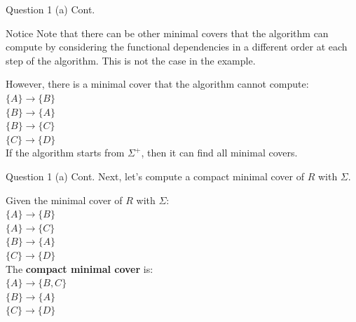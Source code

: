 \begin{frame}[fragile]{Question 1 (a) Cont.}
	\begin{alertblock}{Notice}
	Note that there can be other minimal covers that the algorithm can compute by considering the functional dependencies in a different order at each step of the algorithm. This is not the case in the example.
	\end{alertblock}\vspace{5pt}

	However, there is a minimal cover that the algorithm cannot compute:\\\vspace{5pt}
	$\{A\} \rightarrow \{B\}$\\
	$\{B\} \rightarrow \{A\}$\\
	$\{B\} \rightarrow \{C\}$\\
	$\{C\} \rightarrow \{D\}$\\\vspace{10pt}	
	If the algorithm starts from $\Sigma^{+}$, then it can find all minimal covers.
\end{frame}

\begin{frame}[fragile]{Question 1 (a) Cont.}
	Next, let's compute a compact minimal cover of $R$ with $\Sigma$.\vspace{10pt}
	
	Given the minimal cover of $R$ with $\Sigma$:\\\vspace{3pt}
	$\{A\} \rightarrow \{B\}$\\	
	$\{A\} \rightarrow \{C\}$\\	
	$\{B\} \rightarrow \{A\}$\\
	$\{C\} \rightarrow \{D\}$\\\vspace{5pt}
	The \textbf{compact minimal cover} is:\\\vspace{3pt}
	$\{A\} \rightarrow \{B, C\}$\\	
	$\{B\} \rightarrow \{A\}$\\	
	$\{C\} \rightarrow \{D\}$
\end{frame}

